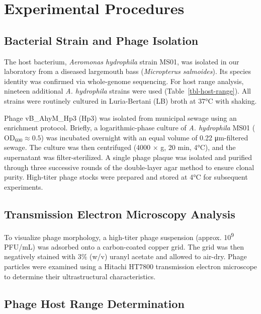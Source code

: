 \section{Experimental Procedures}\label{experimental-procedures}

\subsection{Bacterial Strain and Phage
Isolation}\label{bacterial-strain-and-phage-isolation}

The host bacterium, \emph{Aeromonas hydrophila} strain MS01, was
isolated in our laboratory from a diseased largemouth bass
(\emph{Micropterus salmoides}). Its species identity was confirmed via
whole-genome sequencing. For host range analysis, nineteen additional
\emph{A. hydrophila} strains were used (Table~\ref{tbl-host-range}). All
strains were routinely cultured in Luria-Bertani (LB) broth at 37°C with
shaking.

Phage vB\_AhyM\_Hp3 (Hp3) was isolated from municipal sewage using an
enrichment protocol. Briefly, a logarithmic-phase culture of \emph{A.
hydrophila} MS01 (\(\mathrm{OD}_{600} \approx 0.5\)) was incubated
overnight with an equal volume of 0.22 μm-filtered sewage. The culture
was then centrifuged (4000 × g, 20 min, 4°C), and the supernatant was
filter-sterilized. A single phage plaque was isolated and purified
through three successive rounds of the double-layer agar method to
ensure clonal purity. High-titer phage stocks were prepared and stored
at 4°C for subsequent experiments.

\subsection{Transmission Electron Microscopy
Analysis}\label{transmission-electron-microscopy-analysis}

To visualize phage morphology, a high-titer phage suspension (approx.
10\textsuperscript{9} PFU/mL) was adsorbed onto a carbon-coated copper
grid. The grid was then negatively stained with 3\% (w/v) uranyl acetate
and allowed to air-dry. Phage particles were examined using a Hitachi
HT7800 transmission electron microscope to determine their
ultrastructural characteristics.

\subsection{Phage Host Range
Determination}\label{phage-host-range-determination}

